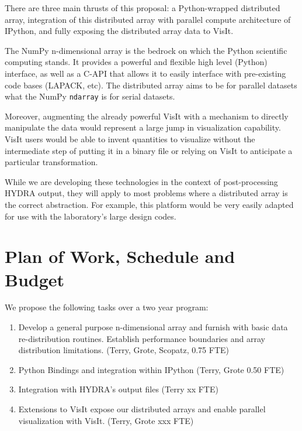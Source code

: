 \documentclass[letterpaper,12pt]{article}
\begin{document}
There are three main thrusts of this proposal: a Python-wrapped distributed array, integration 
of this distributed array with parallel compute architecture of IPython, and fully exposing 
the distributed array data to VisIt.  

The NumPy n-dimensional array is the bedrock on which the Python scientific computing stands.  
It provides a powerful and flexible high level (Python) interface, as well as a C-API that 
allows it to easily interface with pre-existing code bases (LAPACK, etc).  The distributed 
array aims to be for parallel datasets what the NumPy \texttt{ndarray} is for serial datasets.

Moreover, augmenting the already powerful VisIt with a mechanism to directly manipulate the 
data would represent a large jump in visualization capability.  VisIt users would be able 
to invent quantities to visualize without the intermediate step of putting it in a binary 
file or relying on VisIt to anticipate a particular transformation.

While we are developing these technologies in the context of post-processing HYDRA output, 
they will apply to most problems where a distributed array is the correct abstraction.  
For example, this platform would be very easily adapted for use with the laboratory's large 
design codes.




\section*{Plan of Work, Schedule and Budget}

We propose the following tasks over a two year program:

\begin{enumerate}
	\item Develop a general purpose n-dimensional array and furnish with basic data 
		re-distribution routines.  Establish performance boundaries and array distribution 
		limitations. (Terry, Grote, Scopatz, 0.75 FTE) 

	\item Python Bindings and integration within IPython (Terry, Grote 0.50 FTE)

	\item Integration with HYDRA's output files (Terry xx FTE)

	\item Extensions to VisIt expose our distributed arrays and enable parallel visualization 
		with VisIt. (Terry, Grote xxx FTE)

\end{enumerate}
\end{document}
